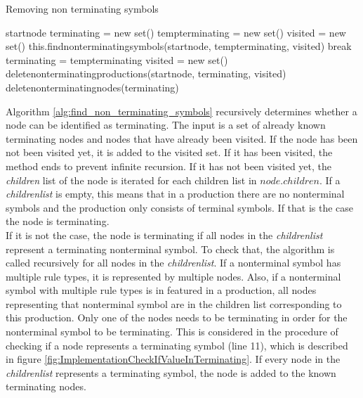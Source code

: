 \begin{algorithm}[H]
\caption{Removing non terminating symbols}
\begin{algorithmic}[1] 
\Require start\textunderscore node
\State terminating = new set()
\State temp\textunderscore terminating = new set()
	\State visited = new set()
	\State this.find\textunderscore non\textunderscore terminating\textunderscore symbols(start\textunderscore node, temp\textunderscore terminating, visited)
		\State break
	\Else
		\State terminating = temp\textunderscore terminating
	\EndIf
\EndWhile
\State visited = new set() 
\State delete\textunderscore non\textunderscore terminating\textunderscore productions(start\textunderscore node, terminating, visited)
\State delete\textunderscore non\textunderscore terminating\textunderscore nodes(terminating)
\end{algorithmic}
\label{alg:remove_non_terminating_symbols}
\end{algorithm}

Algorithm \ref{alg:find_non_terminating_symbols}  recursively determines whether a node can be identified as terminating.
The input is a set of already known terminating nodes and nodes that have already been visited.
If the node has been not been visited yet, it is added to the visited set.
If it has been visited, the method ends to prevent infinite recursion.
If it has not been visited yet, the \textit{children} list of the node is iterated for each children list in $node.children$.
If a \textit{children\textunderscore list} is empty, this means that in a production there are no nonterminal symbols and the production only consists of terminal symbols. If that is the case the node is terminating.\\
If it is not the case, the node is terminating if all nodes in the \textit{children\textunderscore list} represent a terminating nonterminal symbol.
To check that, the algorithm is called recursively for all nodes in the \textit{children\textunderscore list}.
If a nonterminal symbol has multiple rule types, it is represented by multiple nodes. Also, if a nonterminal symbol with multiple rule types is in featured in a production, all nodes representing that nonterminal symbol are in the children list corresponding to this production. Only one of the nodes needs to be terminating in order for the nonterminal symbol to be terminating.
This is considered in the procedure of checking if a node represents a terminating symbol (line 11), which is described in figure \ref{fig:ImplementationCheckIfValueInTerminating}.
If every node in the \textit{children\textunderscore list} represents a terminating symbol, the node is added to the known terminating nodes.

